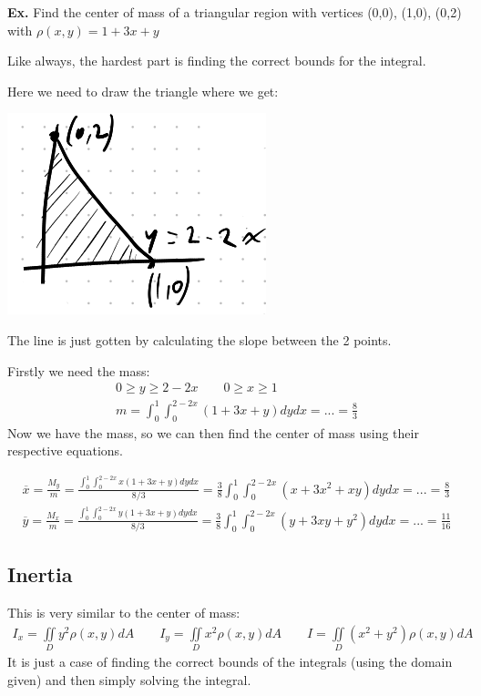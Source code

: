 \documentclass[12pt,letterpaper]{article} \usepackage{amsmath} \usepackage{graphicx} \usepackage[margin=1in]{geometry} \usepackage{longtable}  \usepackage{amssymb}
\begin{document}
	\begin{mdframed}[]
	\textbf{Ex. } Find the center of mass of a triangular region with vertices (0,0), (1,0), (0,2) with $\rho (x,y) = 1+3x+y$
	
	Like always, the hardest part is finding the correct bounds for the integral.
	
	Here we need to draw the triangle where we get:
	\begin{center}
		\includegraphics[width=0.2\linewidth]{ex2}
	\end{center}
	The line is just gotten by calculating the slope between the 2 points. 
	
	Firstly we need the mass:
	\begin{align*}
		0\ge y \ge 2-2x \qquad 0\ge x\ge 1\\
		m = \int _0^1 \int^{2-2x}_0 \left(1+3x+y\right) dydx = ... = \frac{8}{3}
	\end{align*}
	Now we have the mass, so we can then find the center of mass using their respective equations.
	
	\begin{align*}
		\overline{x}= \frac{M_y}{m} = \frac{\int^1_0 \int^{2-2x}_0 x (1+3x+y) dydx}{8/3} = \frac{3}{8} \int^1_0 \int^{2-2x}_0 \left(x+3x^2 +xy\right) dydx = ... = \frac{8}{3} \\
		\overline{y} = \frac{M_x}{m} = \frac{\int^1_0 \int^{2-2x}_0 y (1+3x+y) dydx}{8/3} = \frac{3}{8} \int^1_0 \int^{2-2x}_0 \left(y+3xy +y^2\right) dydx = ... = \frac{11}{16}	
	\end{align*}
	
	\end{mdframed}
	
	\subsection{Inertia}
	This is very similar to the center of mass:
	\begin{align*}
		I_x = \iint\limits_D y^2 \rho(x,y) dA \qquad I_y = \iint\limits_D x^2 \rho(x,y)dA \qquad I = \iint\limits_D \left(x^2 + y^2 \right) \rho(x,y) dA
	\end{align*}
	It is just a case of finding the correct bounds of the integrals (using the domain given) and then simply solving the integral.
	
\end{document}
